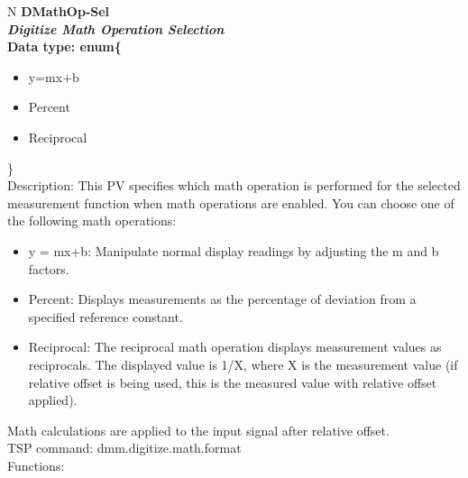 \documentclass[openany]{article}
\begin{document}
		\begin{tabular}{N}
			\hline
			\bfseries DMathOp-Sel\label{pv:dmathop-sel} \\ \hline
			\emph{Digitize Math Operation Selection} \\
			Data type: enum\{\begin{itemize}[noitemsep]
				\small
				\item[] y=mx+b
				\item[] Percent
				\item[] Reciprocal
			\end{itemize}\} \\
			Description: This PV specifies which math operation is performed for the selected measurement function when math operations are enabled. You can choose one of the following math operations: \begin{itemize} \item y = mx+b: Manipulate normal display readings by adjusting the m and b factors. \item Percent: Displays measurements as the percentage of deviation from a specified reference constant. \item Reciprocal: The reciprocal math operation displays measurement values as reciprocals. The displayed value is 1/X, where X is the measurement value (if relative offset is being used, this is the measured value with relative offset applied). \end{itemize} Math calculations are applied to the input signal after relative offset. \\
			TSP command: dmm.digitize.math.format \\
			Functions: \\
			\arrayrulecolor{\FuncTableBorderColor}

		\end{tabular}
\end{document}
